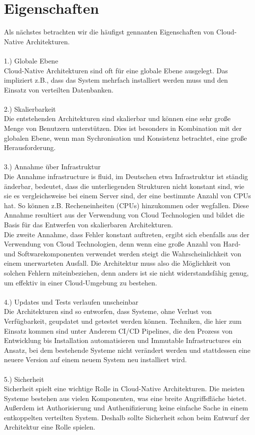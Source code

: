 \section{Eigenschaften}
Als nächstes betrachten wir die häufigst gennanten Eigenschaften von Cloud-Native Architekturen.\\
\\
1.) Globale Ebene\\
Cloud-Native Architekturen sind oft für eine globale Ebene ausgelegt. Das impliziert z.B., dass das System mehrfach installiert werden muss und den Einsatz von verteilten Datenbanken.\\
\\
2.) Skalierbarkeit\\
Die entstehenden Architekturen sind skalierbar und können eine sehr große Menge von Benutzern unterstützen. Dies ist besonders in Kombination mit der globalen Ebene, wenn man Sychronisation und Konsistenz betrachtet, eine große Herausforderung.\\
\\
3.) Annahme über Infrastruktur\\
Die Annahme \glqq infrastructure is fluid\grqq{}, im Deutschen etwa Infrastruktur ist ständig änderbar, bedeutet, dass die unterliegenden Strukturen nicht konstant sind, wie sie es vergleichsweise bei einem Server sind, der eine bestimmte Anzahl von CPUs hat. So können z.B. Recheneinheiten (CPUs) hinzukommen oder wegfallen. Diese Annahme resultiert aus der Verwendung von Cloud Technologien und bildet die Basis für das Entwerfen von skalierbaren Architekturen.\\
Die zweite Annahme, dass Fehler konstant auftreten, ergibt sich ebenfalls aus der Verwendung von Cloud Technologien, denn wenn eine große Anzahl von Hard- und Softwarekomponenten verwendet werden steigt die Wahrscheinlichkeit von einem unerwarteten Ausfall. Die Architektur muss also die Möglichkeit von solchen Fehlern miteinbeziehen, denn anders ist sie nicht widerstandsfähig genug, um effektiv in einer Cloud-Umgebung zu bestehen.\\
\\
4.) Updates und Tests verlaufen unscheinbar\\
Die Architekturen sind so entworfen, dass Systeme, ohne Verlust von Verfügbarkeit, geupdatet und getestet werden können. Techniken, die hier zum Einsatz kommen sind unter Anderem CI/CD Pipelines, die den Prozess von Entwicklung bis Installation automatisieren und Immutable Infrastructures ein Ansatz, bei dem bestehende Systeme nicht verändert werden und stattdessen eine neuere Version auf einem neuem System neu installiert wird.\\
\\
5.) Sicherheit\\
Sicherheit spielt eine wichtige Rolle in Cloud-Native Architekturen. Die meisten Systeme bestehen aus vielen Komponenten, was eine breite Angriffsfläche bietet. Außerdem ist Authorisierung und Authenifizierung keine einfache Sache in einem entkoppelten verteilten System. Deshalb sollte Sicherheit schon beim Entwurf der Architektur eine Rolle spielen.

